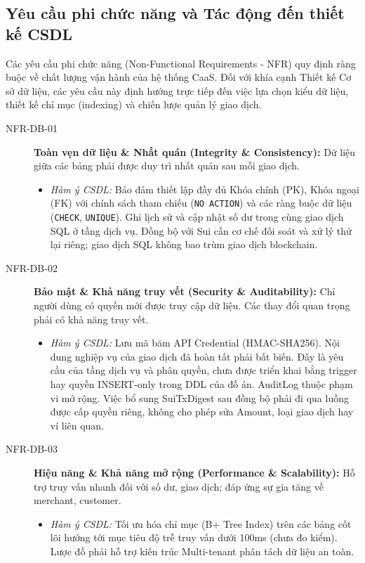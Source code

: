 \subsection{Yêu cầu phi chức năng và Tác động đến thiết kế CSDL}
Các yêu cầu phi chức năng (Non-Functional Requirements - NFR) quy định ràng buộc về chất lượng vận hành của hệ thống CaaS. Đối với khía cạnh Thiết kế Cơ sở dữ liệu, các yêu cầu này định hướng trực tiếp đến việc lựa chọn kiểu dữ liệu, thiết kế chỉ mục (indexing) và chiến lược quản lý giao dịch.

\begin{description}
    \item[NFR-DB-01] \textbf{Toàn vẹn dữ liệu \& Nhất quán (Integrity \& Consistency):} Dữ liệu giữa các bảng phải được duy trì nhất quán sau mỗi giao dịch.
    \begin{itemize}
        \item \textit{Hàm ý CSDL:} Bảo đảm thiết lập đầy đủ Khóa chính (PK), Khóa ngoại (FK) với chính sách tham chiếu (\texttt{NO ACTION}) và các ràng buộc dữ liệu (\texttt{CHECK}, \texttt{UNIQUE}). Ghi lịch sử và cập nhật số dư trong cùng giao dịch SQL ở tầng dịch vụ. Đồng bộ với Sui cần cơ chế đối soát và xử lý thử lại riêng; giao dịch SQL không bao trùm giao dịch blockchain.
    \end{itemize}

    \item[NFR-DB-02] \textbf{Bảo mật \& Khả năng truy vết (Security \& Auditability):} Chỉ người dùng có quyền mới được truy cập dữ liệu. Các thay đổi quan trọng phải có khả năng truy vết.
    \begin{itemize}
        \item \textit{Hàm ý CSDL:} Lưu mã băm API Credential (HMAC-SHA256). Nội dung nghiệp vụ của giao dịch đã hoàn tất phải bất biến. Đây là yêu cầu của tầng dịch vụ và phân quyền, chưa được triển khai bằng trigger hay quyền INSERT-only trong DDL của đồ án. AuditLog thuộc phạm vi mở rộng. Việc bổ sung SuiTxDigest sau đồng bộ phải đi qua luồng được cấp quyền riêng, không cho phép sửa Amount, loại giao dịch hay ví liên quan.
    \end{itemize}

    \item[NFR-DB-03] \textbf{Hiệu năng \& Khả năng mở rộng (Performance \& Scalability):} Hỗ trợ truy vấn nhanh đối với số dư, giao dịch; đáp ứng sự gia tăng về merchant, customer.
    \begin{itemize}
        \item \textit{Hàm ý CSDL:} Tối ưu hóa chỉ mục (B+ Tree Index) trên các bảng cốt lõi hướng tới mục tiêu độ trễ truy vấn dưới 100ms (chưa đo kiểm). Lược đồ phải hỗ trợ kiến trúc Multi-tenant phân tách dữ liệu an toàn.
    \end{itemize}


\end{description}
